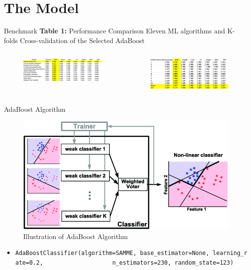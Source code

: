 \documentclass[
  11pt,
  ignorenonframetext,
  fontset=fandol]{beamer}
\providecommand{\tightlist}{%
  \setlength{\itemsep}{0pt}\setlength{\parskip}{0pt}}
\begin{document}
\hypertarget{the-model}{%
\section{The Model}\label{the-model}}

\begin{frame}{Benchmark}
\protect\hypertarget{benchmark}{}
\textbf{Table 1:} Performance Comparison Eleven ML algorithms and
K-folds Cross-validation of the Selected AdaBoost

\begin{columns}
\begin{figure}
\centering
\includegraphics[width=6cm]{images/caret.png}
\end{figure}
\begin{figure}
\centering
\includegraphics[width=6cm]{images/k_fold_tuned_Ada.png}
\end{figure}
\end{columns}
\end{frame}

\begin{frame}[fragile]{AdaBoost Algorithm}
\protect\hypertarget{adaboost-algorithm}{}
\begin{figure}

{\centering \includegraphics[width=0.8\linewidth]{images/AdaBoost} 

}

\caption{Illustration of AdaBoost Algorithm}\label{fig:unnamed-chunk-7}
\end{figure}

\begin{itemize}
\tightlist
\item
  \texttt{AdaBoostClassifier(algorithm=\textquotesingle{}SAMME\textquotesingle{},\ base\_estimator=None,\ learning\_rate=0.2,\ \ \ \ \ \ \ \ \ \ \ \ \ \ \ \ \ \ \ \ n\_estimators=230,\ random\_state=123)}
\end{itemize}
\end{frame}
\end{document}
